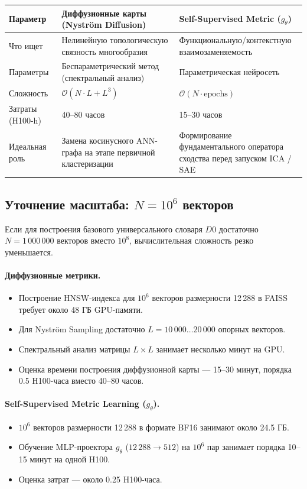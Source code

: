 \documentclass[11pt,a4paper]{article}
\begin{document}
\begin{table}[h!]
\centering
\small
\begin{tabular}{p{3.0cm} p{5.7cm} p{5.7cm}}
\toprule
\textbf{Параметр} & \textbf{Диффузионные карты (Nyström Diffusion)} & \textbf{Self-Supervised Metric ($g_\theta$)} \\
\midrule
Что ищет & Нелинейную топологическую связность многообразия & Функциональную/контекстную взаимозаменяемость \\
Параметры & Беспараметрический метод (спектральный анализ) & Параметрическая нейросеть \\
Сложность & $\mathcal{O}(N\cdot L+L^3)$ & $\mathcal{O}(N\cdot\text{epochs})$ \\
Затраты (H100-h) & 40--80 часов & 15--30 часов \\
Идеальная роль & Замена косинусного ANN-графа на этапе первичной кластеризации & Формирование фундаментального оператора сходства перед запуском ICA / SAE \\
\bottomrule
\end{tabular}
\end{table}

\subsection*{Уточнение масштаба: $N=10^6$ векторов}

Если для построения базового универсального словаря $D0$ достаточно $N=1\,000\,000$ векторов вместо $10^8$, вычислительная сложность резко уменьшается.

\paragraph{Диффузионные метрики.}
\begin{itemize}
    \item Построение HNSW-индекса для $10^6$ векторов размерности 12\,288 в FAISS требует около 48 ГБ GPU-памяти.
    \item Для Nyström Sampling достаточно $L=10\,000\ldots20\,000$ опорных векторов.
    \item Спектральный анализ матрицы $L\times L$ занимает несколько минут на GPU.
    \item Оценка времени построения диффузионной карты — 15--30 минут, порядка 0.5 H100-часа вместо 40--80 часов.
\end{itemize}

\paragraph{Self-Supervised Metric Learning ($g_\theta$).}
\begin{itemize}
    \item $10^6$ векторов размерности 12\,288 в формате BF16 занимают около 24.5 ГБ.
    \item Обучение MLP-проектора $g_\theta$ ($12\,288\rightarrow512$) на $10^6$ пар занимает порядка 10--15 минут на одной H100.
    \item Оценка затрат — около 0.25 H100-часа.
\end{itemize}
\end{document}
